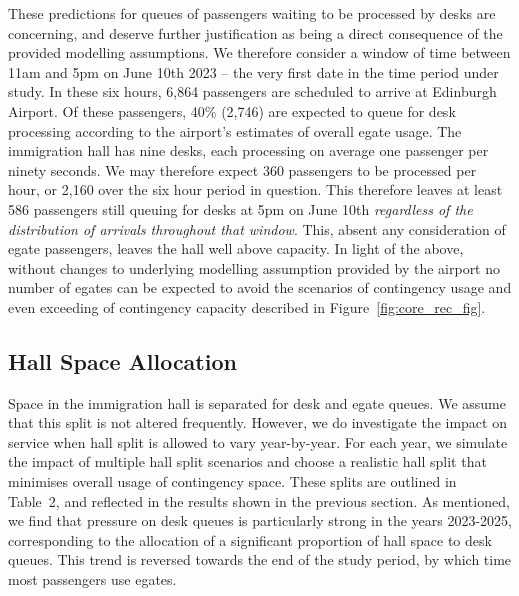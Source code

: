 \documentclass[10pt]{article}
\begin{document}
These predictions for queues of passengers waiting to be processed by desks are concerning, and deserve further justification as being a direct consequence of the provided modelling assumptions. We therefore consider a window of time between 11am and 5pm on June 10th 2023 -- the very first date in the time period under study. In these six hours, 6,864 passengers are scheduled to arrive at Edinburgh Airport. Of these passengers, 40\% (2,746) are expected to queue for desk processing according to the airport's estimates of overall \gls{egate} usage. The immigration hall has nine desks, each processing on average one passenger per ninety seconds. We may therefore expect 360 passengers to be processed per hour, or 2,160 over the six hour period in question. This therefore leaves at least 586 passengers still queuing for desks at 5pm on June 10th \emph{regardless of the distribution of arrivals throughout that window}. This, absent any consideration of \gls{egate} passengers, leaves the hall well above capacity. In light of the above, without changes to underlying modelling assumption provided by the airport no number of \glspl{egate} can be expected to avoid the scenarios of contingency usage and even exceeding of contingency capacity described in Figure~\ref{fig:core_rec_fig}.



\subsection{Hall Space Allocation}

Space in the immigration hall is separated for desk and \gls{egate} queues. We assume that this split is not altered frequently. However, we do investigate the impact on service when hall split is allowed to vary year-by-year. For each year, we simulate the impact of multiple hall split scenarios and choose a realistic hall split that minimises overall usage of contingency space. These splits are outlined in Table~2, and reflected in the results shown in the previous section. As mentioned, we find that pressure on desk queues is particularly strong in the years 2023-2025, corresponding to the allocation of a significant proportion of hall space to desk queues. This trend is reversed towards the end of the study period, by which time most passengers use \glspl{egate}.
\end{document}
